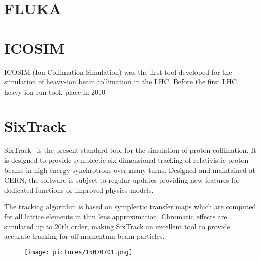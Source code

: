 
\section{FLUKA}




\section{ICOSIM}
ICOSIM (Ion Collimation Simulation) was the first tool developed for the simulation of heavy-ion beam collimation in the LHC. Before the first LHC heavy-ion run took place in 2010  




\section{SixTrack}
SixTrack~\cite{SixTrackref01,SixTrackref02,SixTrackref03,SixTrackref04} is the present standard tool for the simulation of proton collimation. It is designed to provide symplectic six-dimensional tracking of relativistic proton beams in high energy synchrotrons over many turns. Designed and maintained at CERN, the software is subject to regular updates providing new features for dedicated functions or improved physics models. 

The tracking algorithm is based on symplectic transfer maps which are computed for all lattice elements in thin lens approximation. Chromatic effects are simulated up to 20th order, making SixTrack an excellent tool to provide accurate tracking for off-momentum beam particles. 


  \begin{figure}[t]
  \centering
  \texttt{[image: pictures/15070701.png]}
  \caption{}  
  \label{pic:15070701}
  \end{figure}

